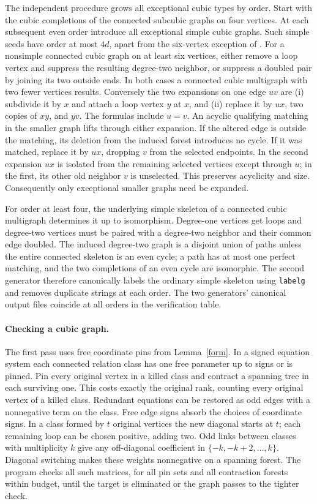 \documentclass[11pt]{article}
\begin{document}
The independent procedure grows all exceptional cubic types by order. Start with the cubic completions of the connected subcubic graphs on four vertices. At each subsequent even order introduce all exceptional simple cubic graphs. Such simple seeds have order at most $4d$, apart from the six-vertex exception of \cite{FR}. For a nonsimple connected cubic graph on at least six vertices, either remove a loop vertex and suppress the resulting degree-two neighbor, or suppress a doubled pair by joining its two outside ends. In both cases a connected cubic multigraph with two fewer vertices results. Conversely the two expansions on one edge $uv$ are (i) subdivide it by $x$ and attach a loop vertex $y$ at $x$, and (ii) replace it by $u x$, two copies of $xy$, and $yv$. The formulas include $u=v$. An acyclic qualifying matching in the smaller graph lifts through either expansion. If the altered edge is outside the matching, its deletion from the induced forest introduces no cycle. If it was matched, replace it by $ux$, dropping $v$ from the selected endpoints. In the second expansion $ux$ is isolated from the remaining selected vertices except through $u$; in the first, its other old neighbor $v$ is unselected. This preserves acyclicity and size. Consequently only exceptional smaller graphs need be expanded.

For order at least four, the underlying simple skeleton of a connected cubic multigraph determines it up to isomorphism. Degree-one vertices get loops and degree-two vertices must be paired with a degree-two neighbor and their common edge doubled. The induced degree-two graph is a disjoint union of paths unless the entire connected skeleton is an even cycle; a path has at most one perfect matching, and the two completions of an even cycle are isomorphic. The second generator therefore canonically labels the ordinary simple skeleton using \texttt{labelg} and removes duplicate strings at each order. The two generators' canonical output files coincide at all orders in the verification table.

\paragraph{Checking a cubic graph.} The first pass uses free coordinate pins from Lemma~\ref{form}. In a signed equation system each connected relation class has one free parameter up to signs or is pinned. Pin every original vertex in a killed class and contract a spanning tree in each surviving one. This costs exactly the original rank, counting every original vertex of a killed class. Redundant equations can be restored as odd edges with a nonnegative term on the class. Free edge signs absorb the choices of coordinate signs. In a class formed by $t$ original vertices the new diagonal starts at $t$; each remaining loop can be chosen positive, adding two. Odd links between classes with multiplicity $k$ give any off-diagonal coefficient in $\{-k,-k+2,\ldots,k\}$. Diagonal switching makes these weights nonnegative on a spanning forest. The program checks all such matrices, for all pin sets and all contraction forests within budget, until the target is eliminated or the graph passes to the tighter check.
\end{document}
